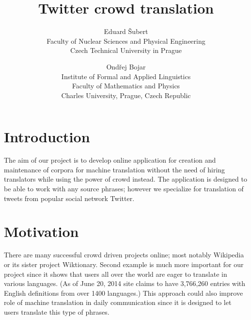 \setlength{\topmargin}{-.5in}
\setlength{\textheight}{9in}
\setlength{\oddsidemargin}{.125in}
\setlength{\textwidth}{6.25in}

\title{\textbf{Twitter crowd translation}}
\author{
Eduard \v{S}ubert\\
Faculty of Nuclear Sciences and Physical Engineering\\
Czech Technical University in Prague
\and
Ond\v{r}ej Bojar\\
Institute of Formal and Applied Linguistics\\
Faculty of Mathematics and Physics\\
Charles University, Prague, Czech Republic
}

\renewcommand{\today}{June 20, 2014}
\maketitle

\def\footurl#1{\footnote{\tt{} #1}}
\def\equo#1{``#1''}

\def\hashtag#1{\texttt{\##1}}

\maketitle
%
\section{Introduction}
The aim of our project is to develop online application for creation and
maintenance of corpora for machine translation without the need of hiring
translators while using the power of crowd instead. The application is designed
to be able to work with any source phrases; however we specialize for
translation of tweets from popular social network Twitter.

%
\section{Motivation}
There are many successful crowd driven projects online; most notably Wikipedia
or its sister project Wiktionary. Second example is much more important for our
project since it shows that users all over the world are eager to translate in
various languages. (As of \today{ }site claims to have 3,766,260 entries with
English definitions from over 1400 languages.) This approach could also improve
role of machine translation in daily communication since it is designed to let
users translate this type of phrases.
%
